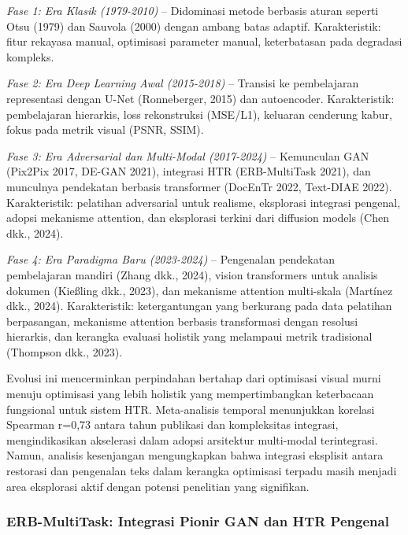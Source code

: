 \documentclass[12pt,a4paper]{article}
\begin{document}
\textit{Fase 1: Era Klasik (1979-2010)} -- Didominasi metode berbasis aturan seperti Otsu (1979) dan Sauvola (2000) dengan ambang batas adaptif. Karakteristik: fitur rekayasa manual, optimisasi parameter manual, keterbatasan pada degradasi kompleks.

\textit{Fase 2: Era Deep Learning Awal (2015-2018)} -- Transisi ke pembelajaran representasi dengan U-Net (Ronneberger, 2015) dan autoencoder. Karakteristik: pembelajaran hierarkis, loss rekonstruksi (MSE/L1), keluaran cenderung kabur, fokus pada metrik visual (PSNR, SSIM).

\textit{Fase 3: Era Adversarial dan Multi-Modal (2017-2024)} -- Kemunculan GAN (Pix2Pix 2017, DE-GAN 2021), integrasi HTR (ERB-MultiTask 2021), dan munculnya pendekatan berbasis transformer (DocEnTr 2022, Text-DIAE 2022). Karakteristik: pelatihan adversarial untuk realisme, eksplorasi integrasi pengenal, adopsi mekanisme attention, dan eksplorasi terkini dari diffusion models (Chen dkk., 2024).

\textit{Fase 4: Era Paradigma Baru (2023-2024)} -- Pengenalan pendekatan pembelajaran mandiri (Zhang dkk., 2024), vision transformers untuk analisis dokumen (Kießling dkk., 2023), dan mekanisme attention multi-skala (Martínez dkk., 2024). Karakteristik: ketergantungan yang berkurang pada data pelatihan berpasangan, mekanisme attention berbasis transformasi dengan resolusi hierarkis, dan kerangka evaluasi holistik yang melampaui metrik tradisional (Thompson dkk., 2023).

Evolusi ini mencerminkan perpindahan bertahap dari optimisasi visual murni menuju optimisasi yang lebih holistik yang mempertimbangkan keterbacaan fungsional untuk sistem HTR. Meta-analisis temporal menunjukkan korelasi Spearman r=0,73 antara tahun publikasi dan kompleksitas integrasi, mengindikasikan akselerasi dalam adopsi arsitektur multi-modal terintegrasi. Namun, analisis kesenjangan mengungkapkan bahwa integrasi eksplisit antara restorasi dan pengenalan teks dalam kerangka optimisasi terpadu masih menjadi area eksplorasi aktif dengan potensi penelitian yang signifikan.

\vspace{1.5ex}

\subsubsection{ERB-MultiTask: Integrasi Pionir GAN dan HTR Pengenal}
\label{subsubsec:erb-multitask}

\vspace{1.5ex}
\end{document}

